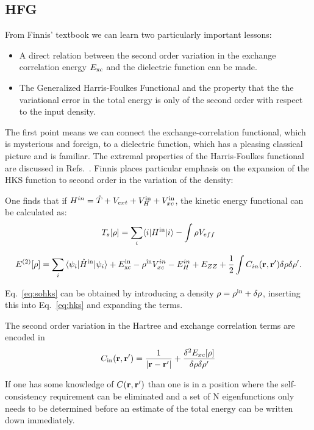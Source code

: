 \subsection{HFG}
From Finnis' textbook we can learn two particularly important lessons:
%
\begin{itemize}
\item A direct relation between the second order variation in the exchange correlation energy
      $E_{\rm xc}$ and the dielectric function can be made.
\item The Generalized Harris-Foulkes Functional and the property that the
      the variational error in the total energy is only of the second order 
      with respect to the input density.
\end{itemize}
%
The first point means we can connect the exchange-correlation functional, 
which is mysterious and foreign, to a dielectric function, which has a pleasing 
classical picture and is familiar.
The extremal properties of the Harris-Foulkes functional are discussed 
in Refs.~\cite{finnis,farid93,methfessel95, haydock97}.
Finnis places particular emphasis on the expansion of 
the HKS function to second order in the variation of the density:

One finds that if $H^{in} = \hat{T}+V_{ext}+V_{H}^{\rm in}+V_{xc}^{\rm in}$,
the kinetic energy functional can be calculated as:
%
\begin{equation}
T_{s}[\rho] = \sum_{i}\langle i|H^{\rm in}|i\rangle - \int\rho V_{eff}
\end{equation}

\begin{equation}
\label{eq:sohks}
E^{(2)}[\rho] = \sum_{i}{\langle \psi_{i}|\hat{H}^{\rm in}|\psi_{i}\rangle} + E_{\rm xc}^{\rm in}
-\rho^{\rm in}V_{xc}^{in} - E_{H}^{in} + E_{ZZ} + \frac{1}{2}\int C_{in}({\bf r},{\bf r}')\delta\rho\delta\rho'.
\end{equation}

Eq.~\ref{eq:sohks} can be obtained by introducing a density $\rho = \rho^{\rm in} + \delta\rho$, 
inserting this into Eq.~\ref{eq:hks} and expanding the terms. 

The second order variation in the Hartree and exchange correlation terms are encoded in
%
\begin{equation}
C_{\rm in}({\bf r},{\bf r}') = \frac{1}{|{\bf r}-{\bf r}'|} + \frac{\delta^{2}E_{xc}[\rho]}{\delta \rho \delta \rho'}
\end{equation}

If one has some knowledge of $C({\bf r},{\bf r}')$ than one is in a position where the self-consistency 
requirement can be eliminated and a set of N eigenfunctions only needs to be determined 
before an estimate of the total energy can be written down immediately.

